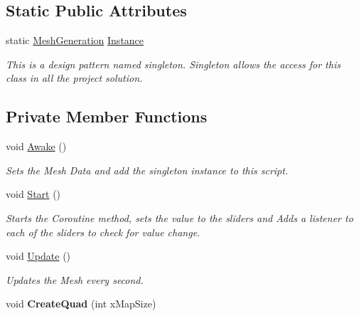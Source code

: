 \subsection*{Static Public Attributes}
\begin{DoxyCompactItemize}
\item 
\mbox{\label{class_assets_1_1_scripts_1_1_mesh_generation_adb4b46217e97f7f7e8ca3aafdb8e72cd}} 
static \mbox{\hyperlink{class_assets_1_1_scripts_1_1_mesh_generation}{Mesh\+Generation}} \mbox{\hyperlink{class_assets_1_1_scripts_1_1_mesh_generation_adb4b46217e97f7f7e8ca3aafdb8e72cd}{Instance}}
\begin{DoxyCompactList}\small\item\em This is a design pattern named singleton. Singleton allows the access for this class in all the project solution. \end{DoxyCompactList}\end{DoxyCompactItemize}
\subsection*{Private Member Functions}
\begin{DoxyCompactItemize}
\item 
void \mbox{\hyperlink{class_assets_1_1_scripts_1_1_mesh_generation_a30849dcee23c658732c99ad36d84dc58}{Awake}} ()
\begin{DoxyCompactList}\small\item\em Sets the Mesh Data and add the singleton instance to this script. \end{DoxyCompactList}\item 
void \mbox{\hyperlink{class_assets_1_1_scripts_1_1_mesh_generation_a41b690987228c88da57a68df85864fb8}{Start}} ()
\begin{DoxyCompactList}\small\item\em Starts the Coroutine method, sets the value to the sliders and Adds a listener to each of the sliders to check for value change. \end{DoxyCompactList}\item 
void \mbox{\hyperlink{class_assets_1_1_scripts_1_1_mesh_generation_a4cb917bfef5c78eba6e24157eb187e4d}{Update}} ()
\begin{DoxyCompactList}\small\item\em Updates the Mesh every second. \end{DoxyCompactList}\item 
\mbox{\label{class_assets_1_1_scripts_1_1_mesh_generation_a62d43347495810972a55224a8ff7a7a1}} 
void {\bfseries Create\+Quad} (int x\+Map\+Size)
\end{DoxyCompactItemize}
